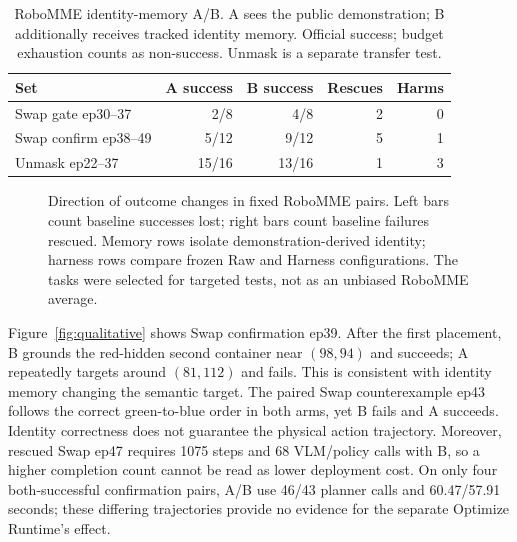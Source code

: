 \documentclass[letterpaper,10pt,conference]{ieeeconf}
\begin{document}
\begin{table}[t]
\caption{RoboMME identity-memory A/B. A sees the public demonstration; B additionally receives tracked identity memory. Official success; budget exhaustion counts as non-success. Unmask is a separate transfer test.}
\label{tab:memory}
\centering\footnotesize
\setlength{\tabcolsep}{4pt}
\begin{tabular}{lrrrr}
\toprule
Set & A success & B success & Rescues & Harms\\
\midrule
Swap gate ep30--37 & 2/8 & 4/8 & 2 & 0\\
Swap confirm ep38--49 & 5/12 & 9/12 & 5 & 1\\
Unmask ep22--37 & 15/16 & 13/16 & 1 & 3\\
\bottomrule
\end{tabular}
\end{table}

\begin{figure}[t]
\centering
\resizebox{0.96\columnwidth}{!}{}
\caption{Direction of outcome changes in fixed RoboMME pairs. Left bars count baseline successes lost; right bars count baseline failures rescued. Memory rows isolate demonstration-derived identity; harness rows compare frozen Raw and Harness configurations. The tasks were selected for targeted tests, not as an unbiased RoboMME average.}
\label{fig:paired}
\end{figure}

Figure~\ref{fig:qualitative} shows Swap confirmation ep39. After the first placement, B grounds the red-hidden
second container near $(98,94)$ and succeeds; A repeatedly targets around
$(81,112)$ and fails. This is consistent with identity memory changing the
semantic target. The paired Swap counterexample ep43 follows the correct
green-to-blue order in both arms, yet B fails and A succeeds. Identity
correctness does not guarantee the physical action trajectory. Moreover,
rescued Swap ep47 requires 1075 steps and 68 VLM/policy calls with B, so a higher
completion count cannot be read as lower deployment cost. On only four
both-successful confirmation pairs, A/B use 46/43 planner calls and
60.47/57.91 seconds; these differing trajectories provide no evidence for
the separate Optimize Runtime's effect.
\end{document}
